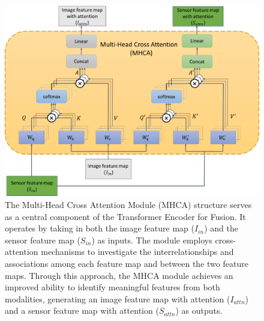 \documentclass[acmsmall, screen]{acmart}
\begin{document}
\begin{figure}[htbp]
  \centering
  \includegraphics[width=0.8\linewidth]{pic/cross_attention.png}
  \caption{The Multi-Head Cross Attention Module (MHCA) structure serves as a central component of the Transformer Encoder for Fusion. It operates by taking in both the image feature map (\begin{math}
    I_{in}
  \end{math}) and the sensor feature map (\begin{math}
    S_{in}
  \end{math}) as inputs. The module employs cross-attention mechanisms to investigate the interrelationships and associations among each feature map and between the two feature maps. Through this approach, the MHCA module achieves an improved ability to identify meaningful features from both modalities, generating an image feature map with attention (\begin{math}
    I_{attn}
  \end{math}) and a sensor feature map with attention (\begin{math}
    S_{attn}
  \end{math}) as outputs.}
  \label{cross_attention}
\end{figure}
\end{document}
